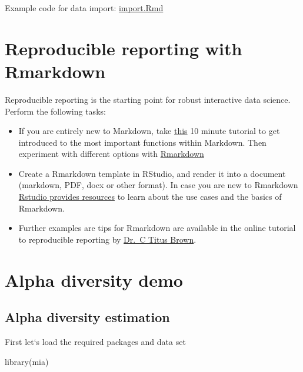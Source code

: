 \documentclass[
  oneside]{book}
\newenvironment{Shaded}{\begin{snugshade}}{\end{snugshade}}
\newcommand{\FunctionTok}[1]{\textcolor[rgb]{0.00,0.00,0.00}{#1}}
\newcommand{\NormalTok}[1]{#1}
\begin{document}
Example code for data import: \url{import.Rmd}

\hypertarget{reproducible-reporting-with-rmarkdown}{%
\chapter{Reproducible reporting with Rmarkdown}\label{reproducible-reporting-with-rmarkdown}}

Reproducible reporting is the starting point for robust interactive
data science. Perform the following tasks:

\begin{itemize}
\item
  If you are entirely new to Markdown, take
  \href{https://www.markdowntutorial.com/}{this} 10 minute tutorial to get
  introduced to the most important functions within Markdown. Then
  experiment with different options with
  \href{https://www.rstudio.com/wp-content/uploads/2015/02/rmarkdown-cheatsheet.pdf}{Rmarkdown}
\item
  Create a Rmarkdown template in RStudio, and render it into a
  document (markdown, PDF, docx or other format). In case you are new
  to Rmarkdown \href{https://rmarkdown.rstudio.com/lesson-1.html}{Rstudio provides
  resources} to learn
  about the use cases and the basics of Rmarkdown.
\item
  Further examples are tips for Rmarkdown are available in the
  online tutorial to reproducible reporting by \href{https://rpubs.com/marschmi/RMarkdown}{Dr.~C Titus
  Brown}.
\end{itemize}

\hypertarget{alpha-diversity-demo}{%
\chapter{Alpha diversity demo}\label{alpha-diversity-demo}}

\hypertarget{alpha-diversity-estimation}{%
\section{Alpha diversity estimation}\label{alpha-diversity-estimation}}

First let`s load the required packages and data set

\begin{Shaded}
\begin{Highlighting}[]
\FunctionTok{library}\NormalTok{(mia)}
\end{Highlighting}
\end{Shaded}
\end{document}
